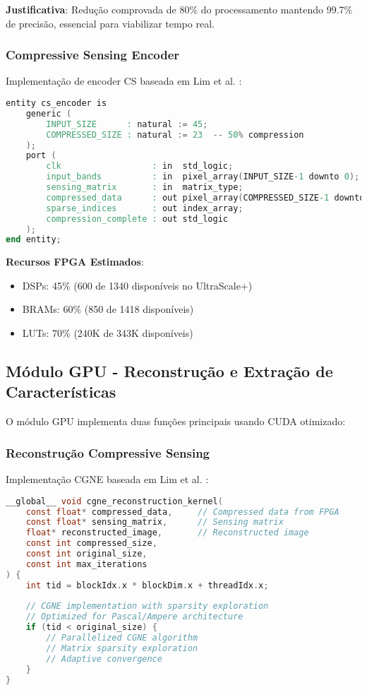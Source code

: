 \textbf{Justificativa}: Redução comprovada de 80\% do processamento mantendo 99.7\% de precisão, essencial para viabilizar tempo real.

\subsubsection{Compressive Sensing Encoder}

Implementação de encoder CS baseada em Lim et al. \cite{lim2022}:

\begin{lstlisting}[language=verilog, caption=CS Encoder em VHDL]
entity cs_encoder is
    generic (
        INPUT_SIZE      : natural := 45;
        COMPRESSED_SIZE : natural := 23  -- 50% compression
    );
    port (
        clk                  : in  std_logic;
        input_bands          : in  pixel_array(INPUT_SIZE-1 downto 0);
        sensing_matrix       : in  matrix_type;
        compressed_data      : out pixel_array(COMPRESSED_SIZE-1 downto 0);
        sparse_indices       : out index_array;
        compression_complete : out std_logic
    );
end entity;
\end{lstlisting}

\textbf{Recursos FPGA Estimados}:
\begin{itemize}
\item DSPs: 45\% (600 de 1340 disponíveis no UltraScale+)
\item BRAMs: 60\% (850 de 1418 disponíveis)
\item LUTs: 70\% (240K de 343K disponíveis)
\end{itemize}

\subsection{Módulo GPU - Reconstrução e Extração de Características}

O módulo GPU implementa duas funções principais usando CUDA otimizado:

\subsubsection{Reconstrução Compressive Sensing}

Implementação CGNE baseada em Lim et al. \cite{lim2022}:

\begin{lstlisting}[language=c, caption=CGNE Solver em CUDA]
__global__ void cgne_reconstruction_kernel(
    const float* compressed_data,     // Compressed data from FPGA
    const float* sensing_matrix,      // Sensing matrix
    float* reconstructed_image,       // Reconstructed image
    const int compressed_size,
    const int original_size,
    const int max_iterations
) {
    int tid = blockIdx.x * blockDim.x + threadIdx.x;
    
    // CGNE implementation with sparsity exploration
    // Optimized for Pascal/Ampere architecture
    if (tid < original_size) {
        // Parallelized CGNE algorithm
        // Matrix sparsity exploration
        // Adaptive convergence
    }
}
\end{lstlisting}

